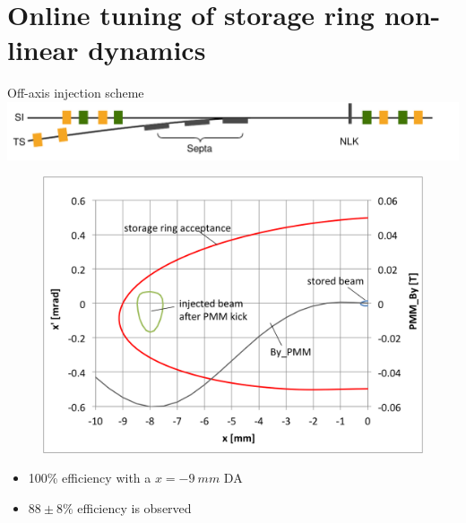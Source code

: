 \documentclass[aspectratio=169]{beamer}
\begin{document}
\section{Online tuning of storage ring non-linear dynamics}
\begin{frame}{Off-axis injection scheme}
    \centering
    \includegraphics[width=\textwidth]{injection.pdf} 
    \begin{minipage}{0.49\textwidth}
        \begin{figure}
            \centering
        \end{figure}
        \begin{figure}
            \centering
            \includegraphics[width=\textwidth]{nlk_phase_space.png}
        \end{figure}
    \end{minipage}
    \begin{minipage}{0.49\textwidth}
        \begin{itemize}
            \item 100\% efficiency with a $x=-9~\unit{mm}$ DA 
            \item $88\pm8\%$ efficiency is observed
        \end{itemize}
    \end{minipage}

\end{frame}
\end{document}
